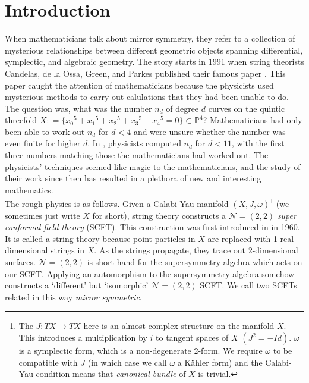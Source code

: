 \documentclass[oneside]{amsart}
\theoremstyle{definition}
\theoremstyle{definition}
\theoremstyle{definition}
\theoremstyle{definition}
\newcommand{\defeq}{\mathrel{\mathop:}=}
\newcommand{\PP}{\mathbb{P}}
\begin{document}
\section{Introduction}
When mathematicians talk about mirror symmetry, they refer to a collection of mysterious relationships between different geometric objects spanning differential, symplectic, and algebraic geometry. The story starts in 1991 when string theorists Candelas, de la Ossa, Green, and Parkes published their famous paper \cite{mirrorsym}. This paper caught the attention of mathematicians because the physicists used mysterious methods to carry out calulations that they had been unable to do. \\
\newline
The question was, what was the number $n_d$ of degree $d$ curves on the quintic threefold $X \defeq \{{x_0}^5 + {x_1}^5 + {x_2}^5 + {x_3}^5 + {x_4}^5 = 0\} \subset \PP^4$? Mathematicians had only been able to work out $n_d$ for $d <4 $ and were unsure whether the number was even finite for higher $d$. In \cite{mirrorsym}, physicists computed $n_d$ for $d < 11$, with the first three numbers matching those the mathematicians had worked out. The physicists' techniques seemed like magic to the mathematicians, and the study of their work since then has resulted in a plethora of new and interesting mathematics. \\
\newline 
The rough physics is as follows. Given a Calabi-Yau manifold $(X,J,\omega)$\footnote{The $J:TX \to TX$ here is an almost complex structure on the manifold $X$. This introduces a multiplication by $i$ to tangent spaces of $X$ $(J^2 = -Id)$. $\omega$ is a symplectic form, which is a non-degenerate 2-form. We require $\omega$ to be compatible with $J$ (in which case we call $\omega$ a Kähler form) and the Calabi-Yau condition means that \textit{canonical bundle} of $X$ is trivial.} (we sometimes just write $X$ for short), string theory constructs a $\mathcal{N}=(2,2)$ \textit{super conformal field theory} (SCFT). This construction was first introduced in \cite[Section 6]{scft} in 1960. It is called a string theory because point particles in $X$ are replaced with 1-real-dimensional strings in $X$. As the strings propagate, they trace out 2-dimensional surfaces. $\mathcal{N}=(2,2)$ is short-hand for the supersymmetry algebra which acts on our SCFT. Applying an automorphism to the supersymmetry algebra somehow constructs a ‘different' but ‘isomorphic' $\mathcal{N}=(2,2)$ SCFT. We call two SCFTs related in this way \textit{mirror symmetric}.
\end{document}
